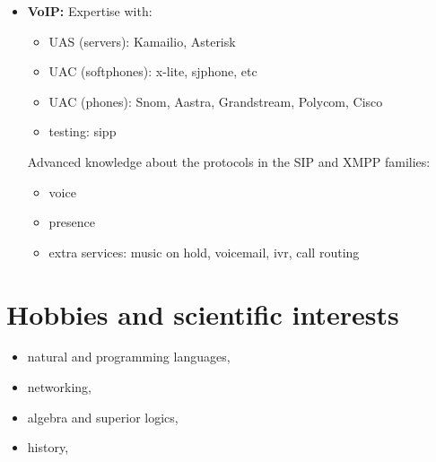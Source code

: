 \documentclass[a4paper,12pt,openany]{article}
\begin{document}
\begin{itemize}
		\item \textbf{VoIP:}
			Expertise with:
			\begin{itemize}
				\item UAS (servers): Kamailio, Asterisk
				\item UAC (softphones): x-lite, sjphone, etc
				\item UAC (phones): Snom, Aastra, Grandstream, Polycom, Cisco
				\item testing: sipp 
			\end{itemize}

			Advanced knowledge about the protocols in the SIP and XMPP families:
			\begin{itemize}
				\item voice
				\item presence
				\item extra services: music on hold, voicemail, ivr, call routing  
			\end{itemize}			

	\end{itemize}
\section{Hobbies and scientific interests}
	\begin{itemize}
		\item natural and programming languages,
		\item networking,
		\item algebra and superior logics,
		\item history, 
	\end{itemize}
\end{document}
